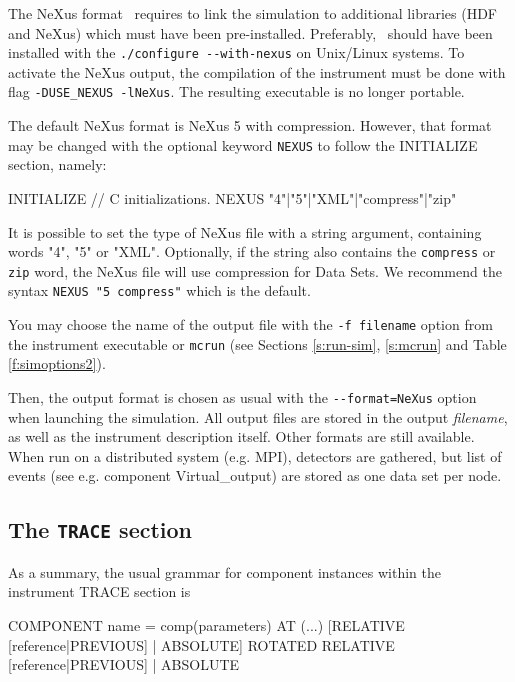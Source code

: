 The NeXus format~\cite{nexus_webpage} requires to link the simulation to
additional libraries (HDF and NeXus) which must have been
pre-installed. Preferably, \MCS\ should have been installed with the
\verb+./configure --with-nexus+ on Unix/Linux systems. To activate the NeXus
output, the compilation of the instrument must be done with flag
\verb+-DUSE_NEXUS -lNeXus+. The resulting executable is no longer portable.

The default NeXus format is NeXus 5 with compression. However, that format may
be changed with the optional keyword \verb+NEXUS+ to follow the INITIALIZE
section, namely:

\begin{mcstas}
INITIALIZE
    // C initializations. 
NEXUS {"4"|"5"|"XML"|"compress"|"zip"}
\end{mcstas}

It is possible to set the type of NeXus file with a string argument, containing
words "4", "5" or "XML". Optionally, if the string also contains the
\verb+compress+ or \verb+zip+ word, the NeXus file will use compression for Data
Sets. We recommend the syntax \verb+NEXUS "5 compress"+ which is the default.

You may choose the name of the output file with the \verb+-f filename+ option
from the instrument executable or \verb+mcrun+ (see Sections \ref{s:run-sim},
\ref{s:mcrun} and Table \ref{f:simoptions2}).

Then, the output format is chosen as usual with the \verb+--format=NeXus+ option
when launching the simulation. All output files are stored in the output {\it
  filename}, as well as the instrument description itself. Other formats are
still available. When run on a distributed system (e.g. MPI), detectors are
gathered, but list of events (see e.g. component Virtual\_output) are stored as
one data set per node.

\subsection{The \texttt{TRACE} section}
\label{s:trace}


As a summary, the usual grammar for component instances within the instrument
TRACE section is
\begin{mcstas}
COMPONENT name = comp(parameters)
  AT (...) [RELATIVE [reference|PREVIOUS] | ABSOLUTE]
 {ROTATED  {RELATIVE [reference|PREVIOUS] | ABSOLUTE} }
\end{mcstas}

